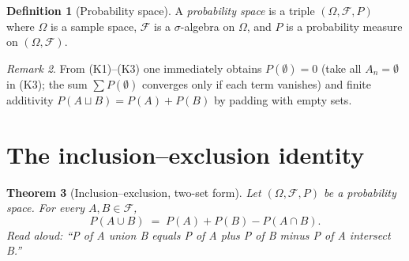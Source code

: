 \documentclass[11pt]{article}
\newtheorem{theorem}{Theorem}
\theoremstyle{definition}
\newtheorem{definition}[theorem]{Definition}
\theoremstyle{remark}
\newtheorem{remark}[theorem]{Remark}
\newcommand{\F}{\mathcal{F}}
\newcommand{\Om}{\Omega}
\begin{document}
\begin{definition}[Probability space]
A \emph{probability space} is a triple $(\Om, \F, P)$ where $\Om$ is a sample space,
$\F$ is a $\sigma$-algebra on $\Om$, and $P$ is a probability measure on $(\Om, \F)$.
\end{definition}

\begin{remark}
From (K1)--(K3) one immediately obtains $P(\emptyset) = 0$ (take all $A_n = \emptyset$ in (K3);
the sum $\sum P(\emptyset)$ converges only if each term vanishes) and finite additivity
$P(A \sqcup B) = P(A) + P(B)$ by padding with empty sets.
\end{remark}

\section{The inclusion--exclusion identity}

\begin{theorem}[Inclusion--exclusion, two-set form]\label{thm:incl-excl}
Let $(\Om, \F, P)$ be a probability space. For every $A, B \in \F$,
\[
    P(A \cup B) \;=\; P(A) + P(B) - P(A \cap B).
\]
\emph{Read aloud:} ``P of A union B equals P of A plus P of B minus P of A intersect B.''
\end{theorem}
\end{document}
